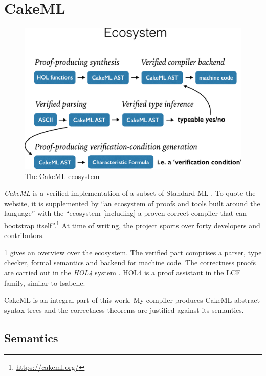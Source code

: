 
\section{CakeML}
\label{sec:intro:cakeml}

\begin{figure}[t]
  \includegraphics[width=\linewidth]{img/ecosystem.pdf}
  \caption[The CakeML ecosystem]{The CakeML ecosystem\footnotemark}
  \label{fig:intro:cakeml}
\end{figure}

\emph{CakeML} is a verified implementation of a subset of Standard ML \cite{kumar2014cakeml,tan2016cakeml}.
To quote the website, it is supplemented by ``an ecosystem of proofs and tools built around the language'' with the ``ecosystem [including] a proven-correct compiler that can bootstrap itself''.\footnote{\url{https://cakeml.org/}}
At time of writing, the project sports over forty developers and contributors.

\cref{fig:intro:cakeml} gives an overview over the ecosystem.
The verified part comprises a parser, type checker, formal semantics and backend for machine code.
The correctness proofs are carried out in the \emph{HOL4} system \cite{hol2014description}.
HOL4 is a proof assistant in the LCF family, similar to Isabelle.

CakeML is an integral part of this work.
My compiler produces CakeML abstract syntax trees and the correctness theorems are justified against its semantics.

\subsection{Semantics}

